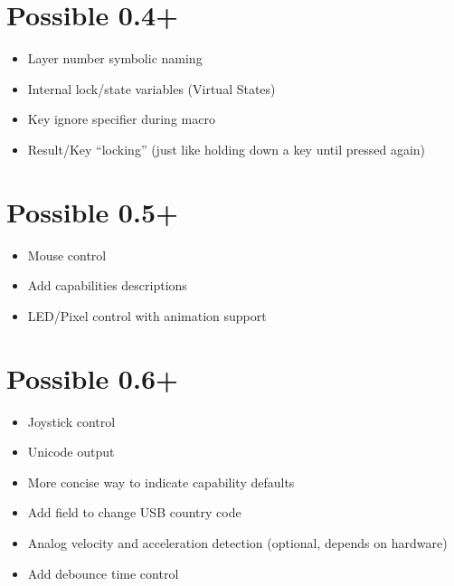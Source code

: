\documentclass{kiibohd-template}
\begin{document}
\section{Possible 0.4+}

\begin{itemize}
\item Layer number symbolic naming
\item Internal lock/state variables (Virtual States)
\item Key ignore specifier during macro
\item Result/Key ``locking'' (just like holding down a key until pressed again)
\end{itemize}

\section{Possible 0.5+}

\begin{itemize}
\item Mouse control
\item Add capabilities descriptions
\item LED/Pixel control with animation support
\end{itemize}

\section{Possible 0.6+}

\begin{itemize}
\item Joystick control
\item Unicode output
\item More concise way to indicate capability defaults
\item Add field to change USB country code
\item Analog velocity and acceleration detection (optional, depends on hardware)
\item Add debounce time control
\end{itemize}
\end{document}
